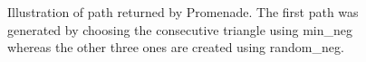 \documentclass[10pt]{article}
\begin{document}
	\begin{figure}[h]
		\label{path}
		\caption{ Illustration of path returned by Promenade. The first path was generated by choosing the consecutive triangle using {\ttfamily min\_neg} whereas the other three ones are created using {\ttfamily random\_neg}.}
	\end{figure}
	
\end{document}

